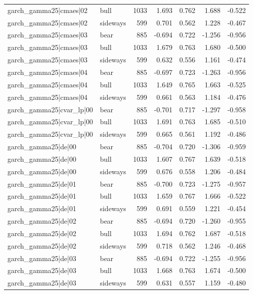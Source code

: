 \begin{table}
\begin{tabular}{llrrrrr}
garch\_gamma25|cmaes|02 & bull & 1033 & 1.693 & 0.762 & 1.688 & -0.522 \\
garch\_gamma25|cmaes|02 & sideways & 599 & 0.701 & 0.562 & 1.228 & -0.467 \\
garch\_gamma25|cmaes|03 & bear & 885 & -0.694 & 0.722 & -1.256 & -0.956 \\
garch\_gamma25|cmaes|03 & bull & 1033 & 1.679 & 0.763 & 1.680 & -0.500 \\
garch\_gamma25|cmaes|03 & sideways & 599 & 0.632 & 0.556 & 1.161 & -0.474 \\
garch\_gamma25|cmaes|04 & bear & 885 & -0.697 & 0.723 & -1.263 & -0.956 \\
garch\_gamma25|cmaes|04 & bull & 1033 & 1.649 & 0.765 & 1.663 & -0.525 \\
garch\_gamma25|cmaes|04 & sideways & 599 & 0.661 & 0.563 & 1.184 & -0.476 \\
garch\_gamma25|cvar\_lp|00 & bear & 885 & -0.701 & 0.717 & -1.297 & -0.958 \\
garch\_gamma25|cvar\_lp|00 & bull & 1033 & 1.691 & 0.763 & 1.685 & -0.510 \\
garch\_gamma25|cvar\_lp|00 & sideways & 599 & 0.665 & 0.561 & 1.192 & -0.486 \\
garch\_gamma25|de|00 & bear & 885 & -0.704 & 0.720 & -1.306 & -0.959 \\
garch\_gamma25|de|00 & bull & 1033 & 1.607 & 0.767 & 1.639 & -0.518 \\
garch\_gamma25|de|00 & sideways & 599 & 0.676 & 0.558 & 1.206 & -0.484 \\
garch\_gamma25|de|01 & bear & 885 & -0.700 & 0.723 & -1.275 & -0.957 \\
garch\_gamma25|de|01 & bull & 1033 & 1.659 & 0.767 & 1.666 & -0.522 \\
garch\_gamma25|de|01 & sideways & 599 & 0.691 & 0.559 & 1.221 & -0.454 \\
garch\_gamma25|de|02 & bear & 885 & -0.694 & 0.720 & -1.260 & -0.955 \\
garch\_gamma25|de|02 & bull & 1033 & 1.694 & 0.762 & 1.687 & -0.518 \\
garch\_gamma25|de|02 & sideways & 599 & 0.718 & 0.562 & 1.246 & -0.468 \\
garch\_gamma25|de|03 & bear & 885 & -0.694 & 0.722 & -1.255 & -0.956 \\
garch\_gamma25|de|03 & bull & 1033 & 1.668 & 0.763 & 1.674 & -0.500 \\
garch\_gamma25|de|03 & sideways & 599 & 0.631 & 0.557 & 1.159 & -0.480 \\

\end{tabular}
\end{table}
